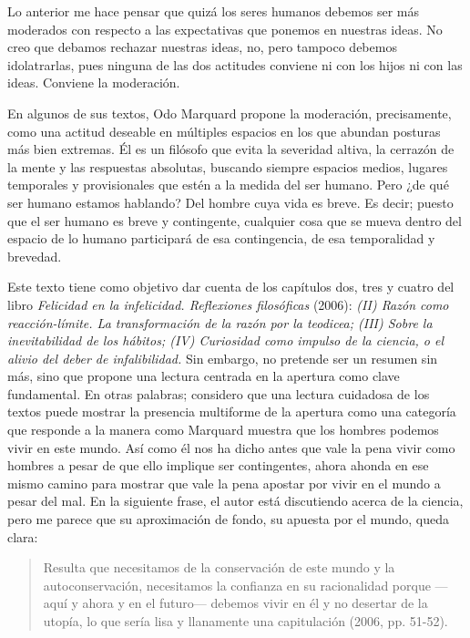 \begin{refsection}
Lo anterior me hace pensar que quizá los seres humanos debemos ser más moderados con respecto a las expectativas que ponemos en nuestras ideas. No creo que debamos rechazar nuestras ideas, no, pero tampoco debemos idolatrarlas, pues ninguna de las dos actitudes conviene ni con los hijos ni con las ideas. Conviene la moderación.

En algunos de sus textos, Odo Marquard propone la moderación, precisamente, como una actitud deseable en múltiples espacios en los que abundan posturas más bien extremas. Él es un filósofo que evita la severidad altiva, la cerrazón de la mente y las respuestas absolutas, buscando siempre espacios medios, lugares temporales y provisionales que estén a la medida del ser humano. Pero ¿de qué ser humano estamos hablando? Del hombre cuya vida es breve. Es decir; puesto que el ser humano es breve y contingente, cualquier cosa que se mueva dentro del espacio de lo humano participará de esa contingencia, de esa temporalidad y brevedad.

Este texto tiene como objetivo dar cuenta de los capítulos dos, tres y cuatro del libro \emph{Felicidad en la infelicidad. Reflexiones filosóficas} (2006): \emph{(II) Razón como reacción-límite. La transformación de la razón por la teodicea; (III) Sobre la inevitabilidad de los hábitos; (IV) Curiosidad como impulso de la ciencia, o el alivio del deber de infalibilidad.} Sin embargo, no pretende ser un resumen sin más, sino que propone una lectura centrada en la apertura como clave fundamental. En otras palabras; considero que una lectura cuidadosa de los textos puede mostrar la presencia multiforme de la apertura como una categoría que responde a la manera como Marquard muestra que los hombres podemos vivir en este mundo. Así como él nos ha dicho antes que vale la pena vivir como hombres a pesar de que ello implique ser contingentes, ahora ahonda en ese mismo camino para mostrar que vale la pena apostar por vivir en el mundo a pesar del mal. En la siguiente frase, el autor está discutiendo acerca de la ciencia, pero me parece que su aproximación de fondo, su apuesta por el mundo, queda clara:

\begin{quote}
Resulta que necesitamos de la conservación de este mundo y la autoconservación, necesitamos la confianza en su racionalidad porque ---aquí y ahora y en el futuro--- debemos vivir en él y no desertar de la utopía, lo que sería lisa y llanamente una capitulación (2006, pp. 51-52).
\end{quote}


\end{refsection}
